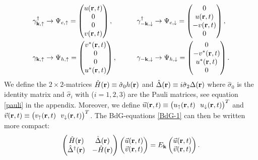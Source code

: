 \begin{equation}
\begin{aligned}
&\gamma_{\bf{k},\uparrow}^{\dagger} \rightarrow \Psi_{e,\uparrow} =
\begin{pmatrix}
    u(\mathbf{r},t) \\ 0 \\ 0 \\ v(\mathbf{r},t)    
\end{pmatrix},
\qquad
&&\gamma_{-\bf{k},\downarrow}^{\dagger} \rightarrow \Psi_{e,\downarrow}=
\begin{pmatrix}
    0 \\ u(\mathbf{r},t) \\ -v(\mathbf{r},t)\\0
\end{pmatrix},\\
&\gamma_{\bf{k},\uparrow} \rightarrow \Psi_{h,\uparrow}=
\begin{pmatrix}
    v^*(\mathbf{r},t)\\0 \\0\\u^*(\mathbf{r},t)
\end{pmatrix},
\qquad
&&\gamma_{-\bf{k},\downarrow} \rightarrow \Psi_{h,\downarrow}=
\begin{pmatrix}
    0\\-v^*(\mathbf{r},t) \\ u^*(\mathbf{r},t)\\0
\end{pmatrix}.
\label{quasi-uv-rep}
\end{aligned}
\end{equation}
We define the $2\times 2$-matrices $\hat{H}(\mathbf{r}) \equiv \hat{\sigma}_0 h(\mathbf{r})$ and $\hat{\Delta}(\mathbf{r}) \equiv i \hat{\sigma}_2\Delta(\mathbf{r})$ where $\hat{\sigma}_0$ is the identity matrix and $\hat{\sigma}_i$ with ($i = 1,2,3$) are the Pauli matrices, see equation \eqref{pauli} in the appendix. Moreover, we define $\vec{u}(\rbf,t) \equiv \big(u_{\uparrow}(\rbf,t) \ \ u_{\downarrow}(\rbf,t)\big)^T$ and $\vec{v}(\rbf,t) \equiv \big(v_{\uparrow}(\rbf,t) \ \ v_{\downarrow}(\rbf,t)\big)^T$. The BdG-equations \eqref{BdG-1} can then be written more compact:
\begin{equation}
    \begin{pmatrix}
        \hat{H}(\mathbf{r}) & \hat{\Delta}(\mathbf{r}) \\
        \hat{\Delta}^{\dagger}(\mathbf{r}) & -\hat{H}(\mathbf{r})
    \end{pmatrix}
    \begin{pmatrix}
        \vec{u}(\mathbf{r},t) \\ \vec{v}(\mathbf{r},t)
    \end{pmatrix}
    =E_{\mathbf{k}}
    \begin{pmatrix}
        \vec{u}(\mathbf{r},t) \\ \vec{v}(\mathbf{r},t)
    \end{pmatrix}.
\label{BdG-2}
\end{equation}

